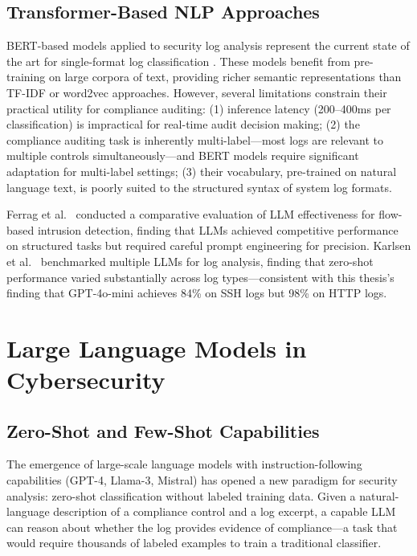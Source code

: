 \documentclass[12pt,oneside]{report}
\begin{document}
\subsection{Transformer-Based NLP Approaches}

BERT-based models applied to security log analysis represent the current state of the art for single-format log classification \cite{karlsen2024}. These models benefit from pre-training on large corpora of text, providing richer semantic representations than TF-IDF or word2vec approaches. However, several limitations constrain their practical utility for compliance auditing: (1) inference latency (200–400ms per classification) is impractical for real-time audit decision making; (2) the compliance auditing task is inherently multi-label—most logs are relevant to multiple controls simultaneously—and BERT models require significant adaptation for multi-label settings; (3) their vocabulary, pre-trained on natural language text, is poorly suited to the structured syntax of system log formats.

Ferrag et al.\ \cite{ferrag2025} conducted a comparative evaluation of LLM effectiveness for flow-based intrusion detection, finding that LLMs achieved competitive performance on structured tasks but required careful prompt engineering for precision. Karlsen et al.\ \cite{karlsen2024} benchmarked multiple LLMs for log analysis, finding that zero-shot performance varied substantially across log types—consistent with this thesis's finding that GPT-4o-mini achieves 84\% on SSH logs but 98\% on HTTP logs.

\section{Large Language Models in Cybersecurity}

\subsection{Zero-Shot and Few-Shot Capabilities}

The emergence of large-scale language models with instruction-following capabilities (GPT-4, Llama-3, Mistral) has opened a new paradigm for security analysis: zero-shot classification without labeled training data. Given a natural-language description of a compliance control and a log excerpt, a capable LLM can reason about whether the log provides evidence of compliance—a task that would require thousands of labeled examples to train a traditional classifier.
\end{document}
